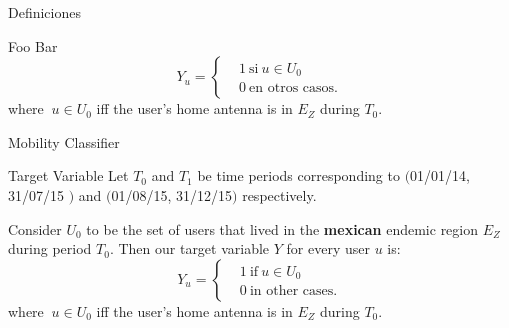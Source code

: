 \documentclass{beamer}
\begin{document}
\begin{frame}{Definiciones}
			\begin{block}{Foo}
			Bar 
			\[
			Y_u =
			\begin{cases}
			&1 \ \mbox{si} \ u \in U_0  \\
			&0 \ \mbox{en otros casos}.
			\end{cases}
			\]
			where $\ u \in U_0$ iff the user's home antenna is in $E_Z$ during $T_0$.
			\end{block}

\end{frame}

\begin{frame}{Mobility Classifier}
			\begin{block}{Target Variable}
			Let $T_0$ and $T_1$ be time periods corresponding to $($01/01/14, 31/07/15 $)$ and $($01/08/15, 31/12/15$)$ respectively.

			Consider $U_0$ to be the set of users that lived in the \textbf{mexican} endemic region $E_Z$ during period $T_0$. Then our target variable $Y$ for every user $u$ is:
			\[
			Y_u =
			\begin{cases}
			&1 \ \mbox{if} \ u \in U_0  \\
			&0 \ \mbox{in other cases}.
			\end{cases}
			\]
			where $\ u \in U_0$ iff the user's home antenna is in $E_Z$ during $T_0$.
			\end{block}

\end{frame}
\end{document}
